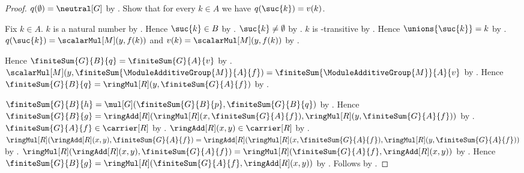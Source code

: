 \begin{proof}
    $q(\emptyset)=\neutral[G]$ by
        .
    Show that for every $k\in A$ we have $q(\suc{k})=v(k)$.
    \begin{subproof}
        Fix $k\in A$.
        $k$ is a natural number by
            .
        Hence $\suc{k}\in B$ by
            .
        $\suc{k}\neq\emptyset$ by .
        $k$ is \in-transitive by
            .
        Hence $\unions{\suc{k}}=k$ by
            .
        $q(\suc{k})=\scalarMul[M](y,f(k))$ and
            $v(k)=\scalarMul[M](y,f(k))$ by
            .
    \end{subproof}
    Hence
        $\finiteSum{G}{B}{q}=\finiteSum{G}{A}{v}$ by
        .
    $\scalarMul[M](y,\finiteSum{\ModuleAdditiveGroup{M}}{A}{f})
        =\finiteSum{\ModuleAdditiveGroup{M}}{A}{v}$ by
        .
    Hence
        $\finiteSum{G}{B}{q}
            =\ringMul[R](y,\finiteSum{G}{A}{f})$ by
        \auto.

    $\finiteSum{G}{B}{h}
        =\mul[G](\finiteSum{G}{B}{p},
            \finiteSum{G}{B}{q})$ by
        .
    Hence
        $\finiteSum{G}{B}{g}
        =\ringAdd[R](
            \ringMul[R](x,\finiteSum{G}{A}{f}),
            \ringMul[R](y,\finiteSum{G}{A}{f}))$ by
        \auto.
    $\finiteSum{G}{A}{f}\in\carrier[R]$ by
        .
    $\ringAdd[R](x,y)\in\carrier[R]$ by .
    $\ringMul[R](\ringAdd[R](x,y),\finiteSum{G}{A}{f})
        =\ringAdd[R](
            \ringMul[R](x,\finiteSum{G}{A}{f}),
            \ringMul[R](y,\finiteSum{G}{A}{f}))$ by
        .
    $\ringMul[R](\ringAdd[R](x,y),\finiteSum{G}{A}{f})
        =\ringMul[R](
            \finiteSum{G}{A}{f},\ringAdd[R](x,y))$ by
        .
    Hence
        $\finiteSum{G}{B}{g}
            =\ringMul[R](
                \finiteSum{G}{A}{f},\ringAdd[R](x,y))$ by
        \auto.
    Follows by .
\end{proof}

